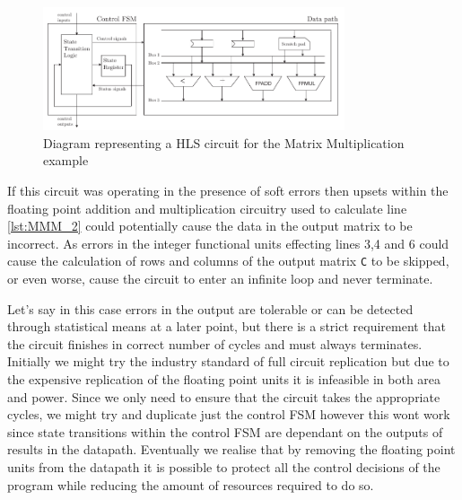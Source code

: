 \begin{figure}[h]
\centering
\includegraphics[width=3.5in]{./imgs/singleHLSArch.pdf}
\caption{Diagram representing a HLS circuit for the Matrix Multiplication example}
\label{fig:singleHLSArch}
\end{figure}

If this circuit was operating in the presence of soft errors then upsets within
the floating point addition and multiplication circuitry used to calculate line \ref{lst:MMM_2} could potentially cause the data in the output
matrix to be incorrect.
As errors in the integer functional units effecting lines 3,4 and 6
could cause the calculation of rows and columns of the output matrix \lstinline$C$ to be skipped, or even
worse, cause the circuit to enter an infinite loop and never terminate.

Let's say in this case errors in
the output are tolerable or can be detected through statistical means at a later point, but
there is a strict requirement that the circuit finishes in correct number of cycles and must
always terminates.
Initially we might try the industry standard of full circuit replication
but due to the expensive replication of the floating point units it is infeasible in both area and power.
Since we only need to ensure that the circuit takes the appropriate cycles,
we might try and duplicate just the control FSM however this wont work since state transitions
within the control FSM are dependant on the outputs of results in the datapath.
Eventually we realise that by removing the floating point units from the datapath
it is  possible to protect all the control decisions of the program while reducing the amount of resources required
to do so.

